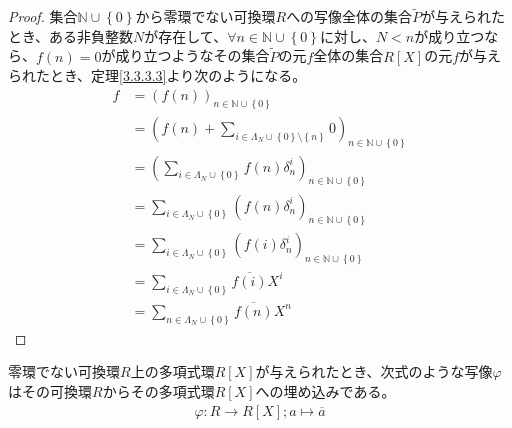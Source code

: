 \documentclass[dvipdfmx]{jsarticle}
\begin{document}
\begin{proof}
集合$\mathbb{N} \cup \left\{ 0 \right\}$から零環でない可換環$R$への写像全体の集合$\widetilde{P}$が与えられたとき、ある非負整数$N$が存在して、$\forall n \in \mathbb{N} \cup \left\{ 0 \right\}$に対し、$N < n$が成り立つなら、$f(n) = 0$が成り立つようなその集合$\widetilde{P}$の元$f$全体の集合$R[ X]$の元$f$が与えられたとき、定理\ref{3.3.3.3}より次のようになる。
\begin{align*}
f &= \left( f(n) \right)_{n \in \mathbb{N} \cup \left\{ 0 \right\}}\\
&= \left( f(n) + \sum_{i \in \varLambda_{N} \cup \left\{ 0 \right\} \setminus \left\{ n \right\}} 0 \right)_{n \in \mathbb{N} \cup \left\{ 0 \right\}}\\
&= \left( \sum_{i \in \varLambda_{N} \cup \left\{ 0 \right\}}  f(n) \delta_{n}^{i} \right)_{n \in \mathbb{N} \cup \left\{ 0 \right\}}\\
&= \sum_{i \in \varLambda_{N} \cup \left\{ 0 \right\}} \left( f(n) \delta_{n}^{i} \right)_{n \in \mathbb{N} \cup \left\{ 0 \right\}}\\
&= \sum_{i \in \varLambda_{N} \cup \left\{ 0 \right\}} \left( f(i) \delta_{n}^{i} \right)_{n \in \mathbb{N} \cup \left\{ 0 \right\}}\\
&= \sum_{i \in \varLambda_{N} \cup \left\{ 0 \right\}} {\overline{f(i)}X^{i}}\\
&= \sum_{n \in \varLambda_{N} \cup \left\{ 0 \right\}} {\overline{f(n)}X^{n}}
\end{align*}
\end{proof}
\begin{thm}\label{3.3.3.6}
零環でない可換環$R$上の多項式環$R[ X]$が与えられたとき、次式のような写像$\varphi$はその可換環$R$からその多項式環$R[ X]$への埋め込みである。
\begin{align*}
\varphi:R \rightarrow R[ X];a \mapsto \overline{a}
\end{align*}
\end{thm}
\end{document}
